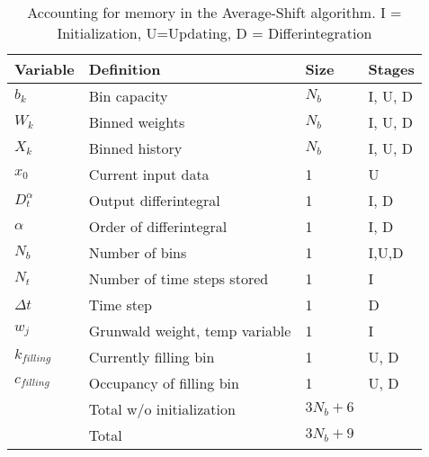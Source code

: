 \begin{table}[h]
\begin{tabular}{llll}
\hline
Variable& Definition & Size& Stages \\
\hline
$b_k$ & Bin capacity & $N_b$ &I, U, D \\
$W_k$ & Binned weights & $N_b$ &I, U, D \\
$X_k$ & Binned history & $N_b$ &I, U, D \\
$x_0$ & Current input data & 1 & U \\
$D_t^\alpha$ & Output differintegral & 1 & I, D\\
$\alpha$ &Order of differintegral &1 &I, D\\
$N_b$ &Number of bins &1 &I,U,D\\
$N_t$ &Number of time steps stored &1 & I\\
$\Delta t$ &Time step &1 &D\\
$w_j$ & Grunwald weight, temp variable & 1 & I\\
$k_{filling}$ & Currently filling bin & 1 & U, D\\
$c_{filling}$ & Occupancy of filling bin & 1 & U, D \\  
\hline
\hline
& Total w/o initialization &$3N_b+6$ &\\
 & Total & $3N_b+9$ &\\
\hline
\end{tabular}
\label{tab:memory}
\caption{Accounting for memory in the Average-Shift algorithm. I = Initialization, U=Updating, D = Differintegration}
\end{table}


